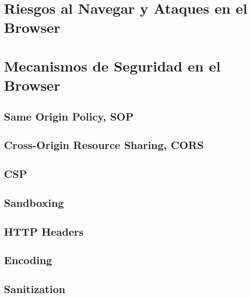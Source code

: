 \section{Riesgos al Navegar y Ataques en el Browser}
\label{sec:chap2.2}


\section{Mecanismos de Seguridad en el Browser}
\label{sec:chap2.3}


\subsection{Same Origin Policy, SOP}
\label{sec:chap2.3.1}


\subsection{Cross-Origin Resource Sharing, CORS}
\label{sec:chap2.3.2}


\subsection{CSP}
\label{sec:chap2.3.3}


\subsection{Sandboxing}
\label{sec:chap2.3.4}


\subsection{HTTP Headers}
\label{sec:chap2.3.5}


\subsection{Encoding}
\label{sec:chap2.3.6}


\subsection{Sanitization}
\label{sec:chap2.3.7}


